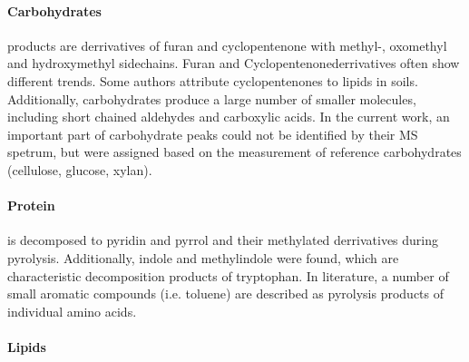 \paragraph{Carbohydrates} products are derrivatives of furan and cyclopentenone with methyl-, oxomethyl and hydroxymethyl sidechains. Furan and Cyclopentenonederrivatives often show different trends. Some authors attribute cyclopentenones to lipids in soils. Additionally, carbohydrates produce a large number of smaller molecules, including short chained aldehydes and carboxylic acids. In the current work, an important part of carbohydrate peaks could not be identified by their MS spetrum, but were assigned based on the measurement of reference carbohydrates (cellulose, glucose, xylan).

\paragraph{Protein} is decomposed to pyridin and pyrrol and their methylated derrivatives during pyrolysis. Additionally, indole and methylindole were found, which are characteristic decomposition products of tryptophan. In literature, a number of small aromatic compounds (i.e. toluene) are described as pyrolysis products of individual amino acids. 

\paragraph{Lipids}